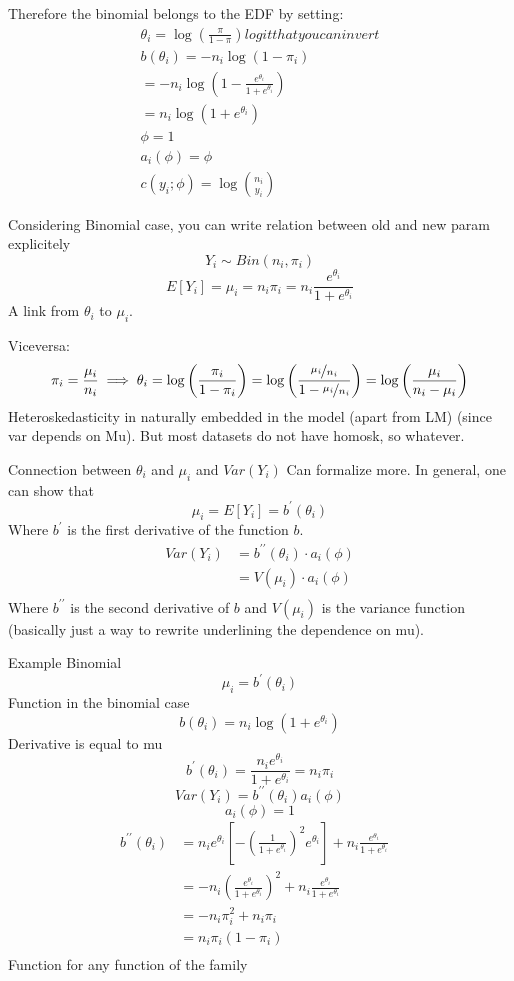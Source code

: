 Therefore the binomial belongs to the EDF by setting:
\begin{align*}
\theta_i = \log\left(\frac{\pi}{1-\pi}\right) logit that you can invert \\
b(\theta_i) = - n_i \log(1-\pi_i) \\
= -n_i \log(1-\frac{e^{\theta_i}}{1 + e^{\theta_i}}) \\
= n_i \log(1 + e^{\theta_i}) \\
\phi = 1 \\
a_i(\phi) = \phi \\
c(y_i; \phi) = \log\binom{n_i}{y_i}
\end{align*}

Considering Binomial case, you can write relation between old and new param explicitely
$$Y_i \sim Bin(n_i, \pi_i)$$
$$E[Y_i] = \mu_i = n_i\pi_i = n_i\frac{e^{\theta_i}}{1 + e^{\theta_i}}$$
A link from $\theta_i$ to $\mu_i$.

Viceversa:
$$\pi_i = \frac{\mu_i}{n_i} \implies \theta_i = \log\left(\frac{\pi_i}{1-\pi_i}\right) = \log\left(\frac{\nicefrac{\mu_i}{n_i}}{1-\nicefrac{\mu_i}{n_i}}\right)=\log\left(\frac{\mu_i}{n_i-\mu_i}\right)$$
Heteroskedasticity in naturally embedded in the model (apart from LM) (since var depends on Mu). But most datasets do not have homosk, so whatever.

Connection between $\theta_i$ and $\mu_i$ and $Var(Y_i)$
Can formalize more. In general, one can show that
$$\mu_i = E[Y_i] = b^\prime(\theta_i)$$
Where $b^\prime$ is the first derivative of the function $b$.
\begin{align*}
Var(Y_i) &= b^{\prime\prime}(\theta_i) \cdot a_i(\phi) \\
         &= V(\mu_i) \cdot a_i(\phi) \\
\end{align*}
Where $b^{\prime\prime}$ is the second derivative of $b$ and $V(\mu_i)$ is the variance function (basically just a way to rewrite underlining the dependence on mu).

Example Binomial
$$\mu_i = b^\prime(\theta_i)$$
Function in the binomial case
$$b(\theta_i) = n_i\log(1+e^{\theta_i})$$
Derivative is equal to mu
$$b^\prime(\theta_i) = \frac{n_ie^{\theta_i}}{1+e^{\theta_i}} = n_i\pi_i$$
$$Var(Y_i) = b^{\prime\prime}(\theta_i)a_i(\phi)$$
$$a_i(\phi) = 1$$
\begin{align*}
b^{\prime\prime}(\theta_i) 
  &= n_ie^{\theta_i}\left[-\left(\frac{1}{1+e^{\theta_i}}\right)^2e^{\theta_i}\right] + n_i\frac{e^{\theta_i}}{1+e^{\theta_i}}
  & \\
  &= -n_i\left(\frac{e^{\theta_i}}{1+e^{\theta_i}}\right)^2 + n_i\frac{e^{\theta_i}}{1+e^{\theta_i}}
  & \\
  &= -n_i\pi_i^2+n_i\pi_i
  & \\
  &= n_i\pi_i(1-\pi_i)
  & \\
\end{align*}
Function for any function of the family 

